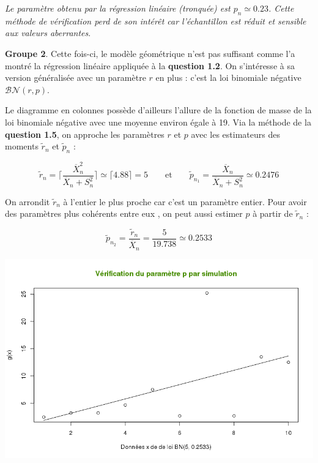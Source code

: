 \documentclass[a4paper,11pt]{article}
\theoremstyle{nonumberplain}
\theoremstyle{nonumberplain}
\theoremstyle{nonumberplain}
\theoremstyle{nonumberplain}
\begin{document}
      \vspace{-3ex}
      \begin{commentaire}
          \hspace{-1ex}\emph{Le paramètre obtenu par la régression linéaire (tronquée) est $p_n \simeq 0.23$.
          Cette méthode de vérification perd de son intérêt car l'échantillon est réduit et sensible aux valeurs aberrantes}.
      \end{commentaire}

      \bigskip
      \textbf{Groupe 2}. \newline
      Cette fois-ci, le modèle géométrique n'est pas suffisant comme l'a montré
      la régression linéaire appliquée à la \textbf{question 1.2}. On s'intéresse à sa version généralisée
      avec un paramètre $r$ en plus : c'est la loi binomiale négative $\mathcal{BN}(r, p)$.

      \smallskip
      Le diagramme en colonnes possède d'ailleurs l'allure de la fonction de
      masse de la loi binomiale négative avec une moyenne environ égale à 19. Via
      la méthode de la \textbf{question 1.5}, on approche les paramètres
      $r$ et $p$ avec les estimateurs des moments $\tilde{r}_n$ et $\tilde{p}_n$ :

      \[
            \tilde{r}_{n} = \lceil \frac{\overline{X}^2_n}{\overline{X}_n + S_n^{2}} \rceil \simeq \lceil 4.88 \rceil = 5 \qquad\text{et}\qquad
            \tilde{p}_{n_1} = \frac{\overline{X}_n}{\overline{X}_n + S_n^{2}} \simeq 0.2476
      \]

      \medskip
      On arrondit $\tilde{r}_{n}$ à l'entier le plus proche car c'est un paramètre
      entier. Pour avoir des paramètres \og plus cohérents entre eux \fg, on peut
      aussi estimer $p$ à partir de $\tilde{r}_{n}$ :

      \[
            \tilde{p}_{n_2} = \frac{\tilde{r}_{n}}{\overline{X}_n} = \frac{5}{19.738} \simeq 0.2533
      \]

      \bigskip
      \begin{center}
          \includegraphics[scale=0.65]{images/p2_q2_verif2.png}
      \end{center}
\end{document}
